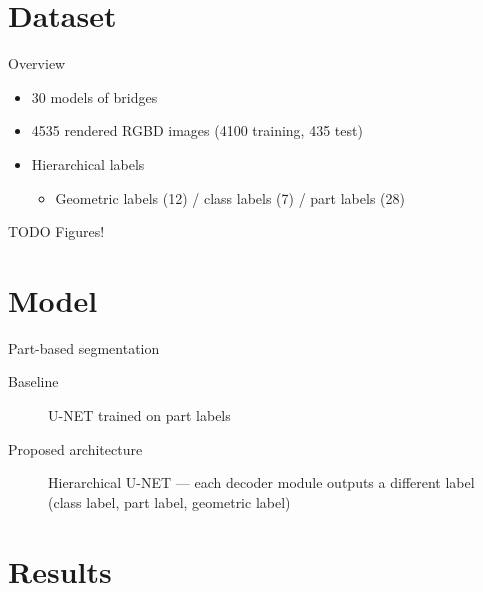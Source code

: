 \documentclass{beamer}
\begin{document}
\section{Dataset}

\begin{frame}{Overview}
  \begin{itemize}
  \item 30 models of bridges
  \item 4535 rendered RGBD images (4100 training, 435 test)
  \item Hierarchical labels
    \begin{itemize}
    \item Geometric labels (12) / class labels (7) / part labels (28)
    \end{itemize}
  \end{itemize}
\end{frame}

\begin{frame}{TODO}
  Figures!
\end{frame}

\section{Model}

\begin{frame}{Part-based segmentation}
  \begin{description}
  \item[Baseline] U-NET trained on part labels
  \item[Proposed architecture] Hierarchical U-NET --- each decoder
    module outputs a different label (class label, part label,
    geometric label)
  \end{description}
  \begin{figure}[h]\centering
  \end{figure}
\end{frame}

\section{Results}
\end{document}
